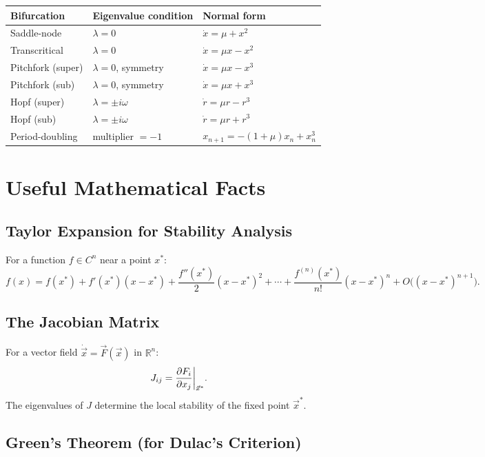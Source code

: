 \documentclass[11pt,letterpaper]{article}
\theoremstyle{definition}
\theoremstyle{plain}
\theoremstyle{remark}
\newcommand{\R}{\mathbb{R}}
\newcommand{\xstar}{x^*}
\begin{document}
\begin{center}
\renewcommand{\arraystretch}{1.3}
\begin{tabular}{@{}lll@{}}
\toprule
\textbf{Bifurcation} & \textbf{Eigenvalue condition} & \textbf{Normal form} \\
\midrule
Saddle-node & $\lambda = 0$ & $\dot{x} = \mu + x^2$ \\
Transcritical & $\lambda = 0$ & $\dot{x} = \mu x - x^2$ \\
Pitchfork (super) & $\lambda = 0$, symmetry & $\dot{x} = \mu x - x^3$ \\
Pitchfork (sub) & $\lambda = 0$, symmetry & $\dot{x} = \mu x + x^3$ \\
Hopf (super) & $\lambda = \pm i\omega$ & $\dot{r} = \mu r - r^3$ \\
Hopf (sub) & $\lambda = \pm i\omega$ & $\dot{r} = \mu r + r^3$ \\
Period-doubling & multiplier $= -1$ & $x_{n+1} = -(1+\mu)x_n + x_n^3$ \\
\bottomrule
\end{tabular}
\end{center}

\section{Useful Mathematical Facts}\label{app:math-facts}

\subsection{Taylor Expansion for Stability Analysis}

For a function $f\in C^n$ near a point $\xstar$:
\[
  f(x) = f(\xstar) + f'(\xstar)(x-\xstar) + \frac{f''(\xstar)}{2}(x-\xstar)^2
  + \cdots + \frac{f^{(n)}(\xstar)}{n!}(x-\xstar)^n + O\bigl((x-\xstar)^{n+1}\bigr).
\]

\subsection{The Jacobian Matrix}

For a vector field $\dot{\vec{x}} = \vec{F}(\vec{x})$ in $\R^n$:
\[
  J_{ij} = \pdv{F_i}{x_j}\bigg|_{\vec{x}^*}.
\]
The eigenvalues of $J$ determine the local stability of the fixed point
$\vec{x}^*$.

\subsection{Green's Theorem (for Dulac's Criterion)}
\end{document}
